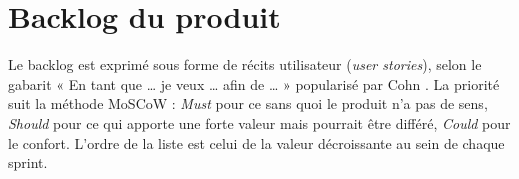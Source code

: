\section{Backlog du produit}
\label{sec:backlog}

Le backlog est exprimé sous forme de récits utilisateur (\textit{user stories}), selon le gabarit « En tant que \dots{} je veux \dots{} afin de \dots{} » popularisé par Cohn \cite{cohn2004userstories}. La priorité suit la méthode MoSCoW : \textit{Must} pour ce sans quoi le produit n'a pas de sens, \textit{Should} pour ce qui apporte une forte valeur mais pourrait être différé, \textit{Could} pour le confort. L'ordre de la liste est celui de la valeur décroissante au sein de chaque sprint.

\renewcommand{\arraystretch}{1.25}
\small
